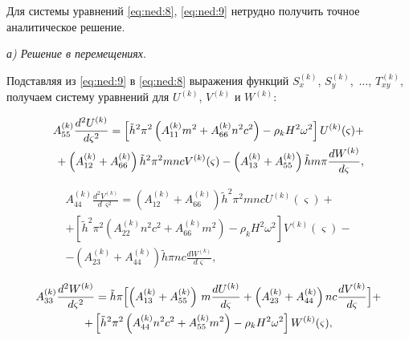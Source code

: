 Для системы уравнений \eqref{eq:ned:8}, \eqref{eq:ned:9} нетрудно получить точное аналитическое решение.



\smallskip


{\it а\/\rm) \it  Решение в перемещениях\/}.

Подставляя  из \eqref{eq:ned:9} в \eqref{eq:ned:8} выражения функций $S_x^{(k)}$, $S_y^{(k)}$,~$\ldots$, $T_{xy}^{(k)}$, получаем систему уравнений для $U^{(k)}$, $V^{(k)}$ и $W^{(k)}$:

\begin{multline*}

A_{55}^{(k)}\frac{{d^2U^{(k)}}}{{d\varsigma^2}}=\left[{\tilde h^2\pi^2\left({A_{11}^{(k)} m^2+ A_{66}^{(k)} n^2 c^2}\right)-\rho_k H^2\omega ^2}\right]U^{(k)}(\varsigma)+\\

%

\null\hfill\displaystyle+\left({A_{12}^{(k)}+A_{66}^{(k)}}\right)\tilde h^2\pi ^2 mncV^{(k)}(\varsigma)-\left({A_{13}^{(k)}+A_{55}^{(k)}}\right)\tilde hm\pi\frac{{dW^{(k)}}}{{d\varsigma}},

\end{multline*}

\begin{multline}

\label{eq:ned:10}

A_{44}^{(k)}\frac{{d^2 V^{(k)}}}{{d\,\varsigma ^2}}=\left({A_{12}^{(k)}+A_{66}^{(k)}}\right)\tilde h^2\pi ^2 mncU^{(k)}(\varsigma)+\\

%

+\left[ {\tilde h^2\pi ^2\left({A_{22}^{(k)} n^2 c^2+A_{66}^{(k)} m^2}\right)-\rho_k H^2\omega ^2}\right]V^{(k)}(\varsigma)-\\

%

-\left({A_{23}^{(k)}+A_{44}^{(k)}}\right)\tilde h\pi nc\frac{{dW^{(k)}}}{{d\varsigma}},

\end{multline}

\begin{multline*}

A_{33}^{(k)}\frac{{d^2 W^{(k)}}}{{d\varsigma ^2}}=\tilde h\pi\Bigl[ {\left({A_{13}^{(k)}+A_{55}^{(k)}}\right)\,m\frac{{dU^{(k)}}}{{d\varsigma}}+\left({A_{23}^{(k)}+A_{44}^{(k)}}\right)nc\frac{{dV^{(k)}}}{{d\varsigma}}}\Bigr]+\\

%

+\left[ {\tilde h^2\pi ^2\left({A_{44}^{(k)} n^2 c^2+A_{55}^{(k)} m^2}\right)-\rho_k H^2\omega ^2}\right]W^{(k)}(\varsigma),

\end{multline*}


